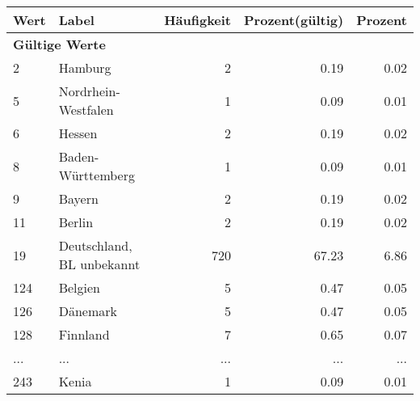      \begin{longtable}{lXrrr}
     \toprule
     \textbf{Wert} & \textbf{Label} & \textbf{Häufigkeit} & \textbf{Prozent(gültig)} & \textbf{Prozent} \\
     \endhead
     \midrule
     \multicolumn{5}{l}{\textbf{Gültige Werte}}\\
        2 & \multicolumn{1}{X}{Hamburg} & %
          \num{2} &
          \num[round-mode=places,round-precision=2]{0.19} &
          \num[round-mode=places,round-precision=2]{0.02} \\
        5 & \multicolumn{1}{X}{Nordrhein-Westfalen} & %
          \num{1} &
          \num[round-mode=places,round-precision=2]{0.09} &
          \num[round-mode=places,round-precision=2]{0.01} \\
        6 & \multicolumn{1}{X}{Hessen} & %
          \num{2} &
          \num[round-mode=places,round-precision=2]{0.19} &
          \num[round-mode=places,round-precision=2]{0.02} \\
        8 & \multicolumn{1}{X}{Baden-Württemberg} & %
          \num{1} &
          \num[round-mode=places,round-precision=2]{0.09} &
          \num[round-mode=places,round-precision=2]{0.01} \\
        9 & \multicolumn{1}{X}{Bayern} & %
          \num{2} &
          \num[round-mode=places,round-precision=2]{0.19} &
          \num[round-mode=places,round-precision=2]{0.02} \\
        11 & \multicolumn{1}{X}{Berlin} & %
          \num{2} &
          \num[round-mode=places,round-precision=2]{0.19} &
          \num[round-mode=places,round-precision=2]{0.02} \\
        19 & \multicolumn{1}{X}{Deutschland, BL unbekannt} & %
          \num{720} &
          \num[round-mode=places,round-precision=2]{67.23} &
          \num[round-mode=places,round-precision=2]{6.86} \\
        124 & \multicolumn{1}{X}{Belgien} & %
          \num{5} &
          \num[round-mode=places,round-precision=2]{0.47} &
          \num[round-mode=places,round-precision=2]{0.05} \\
        126 & \multicolumn{1}{X}{Dänemark} & %
          \num{5} &
          \num[round-mode=places,round-precision=2]{0.47} &
          \num[round-mode=places,round-precision=2]{0.05} \\
        128 & \multicolumn{1}{X}{Finnland} & %
          \num{7} &
          \num[round-mode=places,round-precision=2]{0.65} &
          \num[round-mode=places,round-precision=2]{0.07} \\
       ... & ... & ... & ... & ... \\
        243 & \multicolumn{1}{X}{Kenia} & %
          \num{1} &
          \num[round-mode=places,round-precision=2]{0.09} &
          \num[round-mode=places,round-precision=2]{0.01} \\


\end{longtable}
